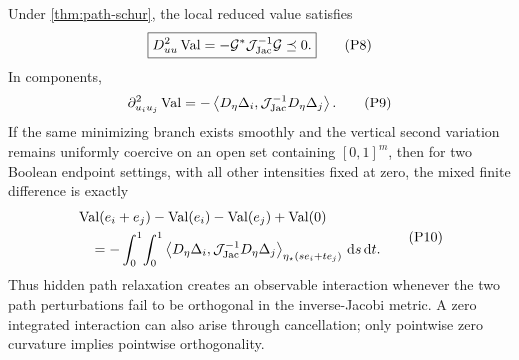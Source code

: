 \begin{corollary}
\label{cor:path-interaction}
Under \cref{thm:path-schur}, the local reduced value satisfies
\begin{equation}
  \boxed{
  D^2_{uu}\operatorname{Val}
  =
  -\mathcal G^*\mathcal J_{\mathrm{Jac}}^{-1}\mathcal G
  \preceq0.}
  \tag{P8}
\end{equation}
In components,
\begin{equation}
  \partial^2_{u_i u_j}\operatorname{Val}
  =
  -\left\langle D_\eta\Delta_i,\mathcal J_{\mathrm{Jac}}^{-1}D_\eta\Delta_j\right\rangle.
  \tag{P9}
\end{equation}
If the same minimizing branch exists smoothly and the vertical second
variation remains uniformly coercive on an open set containing
\([0,1]^m\), then for two Boolean endpoint settings, with all other
intensities fixed at zero, the mixed finite difference is exactly
\begin{equation}
\begin{aligned}
  &\operatorname{Val}(e_i+e_j)-\operatorname{Val}(e_i)-\operatorname{Val}(e_j)+\operatorname{Val}(0)\\
  &\quad=
  -\int_0^1\!\int_0^1
  \left\langle D_\eta\Delta_i,\mathcal J_{\mathrm{Jac}}^{-1}D_\eta\Delta_j\right\rangle_{\eta_\star(se_i+te_j)}
  \,\mathrm d s\,\mathrm d t.
\end{aligned}
\tag{P10}
\end{equation}
Thus hidden path relaxation creates an observable interaction whenever the two
path perturbations fail to be orthogonal in the inverse-Jacobi metric.  A zero
integrated interaction can also arise through cancellation; only pointwise
zero curvature implies pointwise orthogonality.
\end{corollary}

